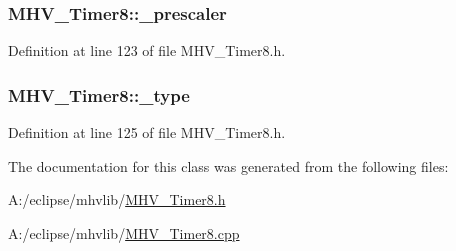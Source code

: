 \hypertarget{class_m_h_v___timer8_a2d610b4bbd5aef2db6a4062dbd063aba}{
\subsubsection[{\-\_\-prescaler}]{ {\bf \-M\-H\-V\-\_\-\-Timer8\-::\-\_\-prescaler}}}
\label{class_m_h_v___timer8_a2d610b4bbd5aef2db6a4062dbd063aba}


\-Definition at line 123 of file \-M\-H\-V\-\_\-\-Timer8.\-h.

\hypertarget{class_m_h_v___timer8_a10c0fdfbbe901b923ea7fb1c0fc9690c}{
\subsubsection[{\-\_\-type}]{ {\bf \-M\-H\-V\-\_\-\-Timer8\-::\-\_\-type}}}
\label{class_m_h_v___timer8_a10c0fdfbbe901b923ea7fb1c0fc9690c}


\-Definition at line 125 of file \-M\-H\-V\-\_\-\-Timer8.\-h.



\-The documentation for this class was generated from the following files\-:\begin{DoxyCompactItemize}
\item 
\-A\-:/eclipse/mhvlib/\hyperlink{_m_h_v___timer8_8h}{\-M\-H\-V\-\_\-\-Timer8.\-h}\item 
\-A\-:/eclipse/mhvlib/\hyperlink{_m_h_v___timer8_8cpp}{\-M\-H\-V\-\_\-\-Timer8.\-cpp}\end{DoxyCompactItemize}
